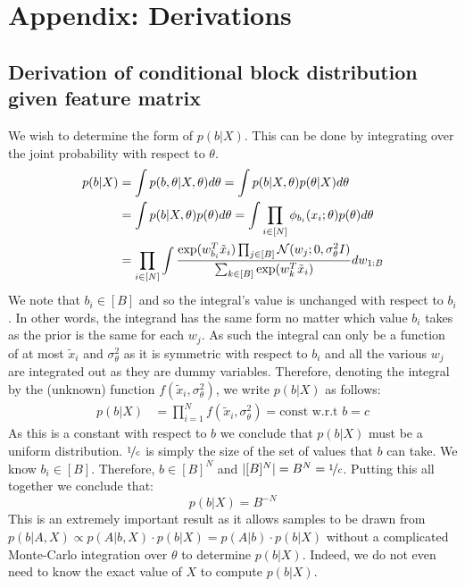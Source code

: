\section{Appendix: Derivations}

\subsection{Derivation of conditional block distribution given feature matrix}
\label{appdx:b|x}

We wish to determine the form of $p(b| X)$. This can be done by integrating over the joint probability with respect to $\theta$.
%
\begin{align*}
	p(b | X) &= \int p(b , \theta| X, \theta) d\theta = \int p(b | X, \theta) p(\theta | X) d\theta \\
	&=\int p(b | X, \theta) p(\theta) d\theta = \int \prod_{i \in [N] } \phi_{b_i}(x_i; \theta) p(\theta) d\theta \\
	&= \prod_{i \in [N]} \int \frac{\exp(w_{b_i}^T \tilde{x}_i) \prod_{j \in [B]} \mathcal{N}(w_j; 0, \sigma_\theta^2 I)}{\sum_{k \in [B]} \exp(w_{k}^T \tilde{x}_i)} dw_{1:B}
\end{align*}
%
We note that $b_i \in [B]$ and so the integral's value is unchanged with respect to $b_i$. In other words, the integrand has the same form no matter which value $b_i$ takes as the prior is the same for each $w_j$. As such the integral can only be a function of at most $\tilde{x}_i$ and $\sigma_\theta^2$ as it is symmetric with respect to $b_i$ and all the various $w_j$ are integrated out as they are dummy variables. Therefore, denoting the integral by the (unknown) function $f(\tilde{x}_i, \sigma_\theta^2)$, we write $p(b| X)$ as follows:
%
\begin{align*}
	p(b | X) &= \prod_{i=1}^{N} f(\tilde{x}_i, \sigma_\theta^2) = \textrm{const w.r.t } b = c
\end{align*}
%
As this is a constant with respect to $b$ we conclude that $p(b | X)$ must be a uniform distribution. $\nicefrac{1}{c}$ is simply the size of the set of values that $b$ can take. We know $b_i \in [B]$. Therefore, $b \in [B]^N$ and $|[B]^N| = B^N = \nicefrac{1}{c}$. Putting this all together we conclude that:
%
\begin{equation}
	p(b | X) = B^{-N}
\end{equation}
%
This is an extremely important result as it allows samples to be drawn from $p(b | A, X) \propto p(A|b, X) \cdot p(b | X) = p(A|b) \cdot p(b|X)$ without a complicated Monte-Carlo integration over $\theta$ to determine $p(b|X)$. Indeed, we do not even need to know the exact value of $X$ to compute $p(b|X)$. 
